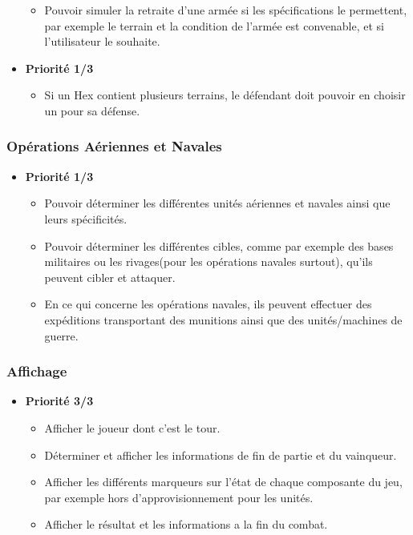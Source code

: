 \begin{itemize}
\begin{itemize}
\begin{itemize}
        \end{itemize}
        \item Pouvoir simuler la retraite d'une armée si les spécifications le permettent, par exemple le terrain et la condition de l'armée est convenable, et si l'utilisateur le souhaite.
    \end{itemize}
    \item \textbf{Priorité 1/3}
    \begin{itemize}
        \item Si un Hex contient plusieurs terrains, le défendant doit pouvoir en choisir un pour sa défense.
    \end{itemize}
\end{itemize}

\subsubsection{Opérations Aériennes et Navales}
\begin{itemize}
    \item \textbf{Priorité 1/3}
    \begin{itemize}
        \item Pouvoir déterminer les différentes unités aériennes et navales ainsi que leurs spécificités.\xmark
        \item Pouvoir déterminer les différentes cibles, comme par exemple des bases militaires ou les rivages(pour les opérations navales surtout), qu'ils peuvent cibler et attaquer.\xmark
        \item En ce qui concerne les opérations navales, ils peuvent effectuer des expéditions transportant des munitions ainsi que des unités/machines de guerre.\xmark
    \end{itemize}
\end{itemize}

\subsubsection{Affichage}
\begin{itemize}
    \item \textbf{Priorité 3/3}
    \begin{itemize}
        \item Afficher le joueur dont c'est le tour.\cmark
        \item Déterminer et afficher les informations de fin de partie et du vainqueur.
        \item Afficher les différents marqueurs sur l'état de chaque composante du jeu, par exemple hors d'approvisionnement pour les unités.\cmark
        \item Afficher le résultat et les informations a la fin du combat.\cmark
    \end{itemize}
\end{itemize}

